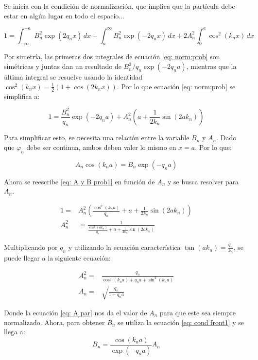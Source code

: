 Se inicia con la condición de normalización, que implica que la partícula debe estar en algún lugar en todo el espacio... 

\begin{equation}
    1 = \int_{-\infty}^{-a}B_n^2 \exp (2q_nx) \, dx 
    + \int_a^{\infty} B_n^2 \exp (-2q_nx) \, dx
    +2A^2_n \int_0^a\cos^2 (k_nx) \,dx
    \label{eq: norm:prob}
\end{equation}


Por simetría, las primeras dos integrales de ecuación \ref{eq: norm:prob} son simétricas y juntas dan un resultado de $B_n^2/q_n \exp (-2q_n a)$, mientras que la última integral se resuelve usando la identidad $\cos^2(k_nx)=\frac{1}{2}(1+\cos(2k_nx))$. Por lo que ecuación \ref{eq: norm:prob} se simplifica a:

\begin{equation}
    1= \frac{B^2_n}{q_n} \exp (-2q_na)+A_n^2\left(a+\frac{1}{2k_n}\sin(2ak_n)\right)
    \label{eq: A y B prob1}
\end{equation}


Para simplificar esto, se necesita una relación entre la variable $B_n$ y $A_n$. Dado que $\varphi_n$ debe ser continua, ambos deben valer lo mismo en $x=a$. Por lo que:

\begin{equation}
    A_n\cos(k_na)=B_n \exp(-q_na)
    \label{eq: cond front1}
\end{equation}

Ahora se reescribe \ref{eq: A y B prob1} en función de $A_n$ y se busca resolver para $A_n$.

\begin{align}
    1=&A_n^2\left(\frac{\cos^2(k_na)}{q_n}+a+\frac{1}{2k_n}\sin(2ak_n)\right) \\
    A_n^2 &= \frac{1}{\frac{\cos^2(ak_n)}{q_n} + a+\frac{1}{2k_n}\sin(2ak_n)}
\end{align}

Multiplicando por $q_n$ y utilizando la ecuación característica $\tan(ak_n)=\frac{q_n}{k_n}$, se puede llegar a la siguiente ecuación:

\begin{align}
    A_n^2 =& \frac{q_n}{\cos^2(k_na)+q_na+\sin^2(k_na)} \\
    A_n =& \sqrt{\frac{q_n}{1+q_na}} \label{eq: A par}
\end{align}

Donde la ecuación \ref{eq: A par} nos da el valor de $A_n$ para que este sea siempre normalizado. Ahora, para obtener $B_n$ se utiliza la ecuación \ref{eq: cond front1} y se llega a:
\begin{equation}
    B_n=\frac{\cos(k_na)}{\exp(-q_na)}A_n
\end{equation}

